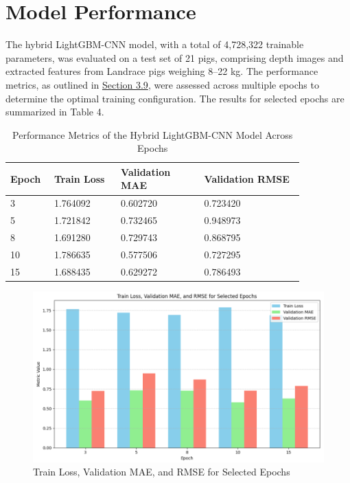 \section{Model Performance}

The hybrid LightGBM-CNN model, with a total of 4,728,322 trainable parameters, was evaluated on a test set of 21 pigs, comprising depth images and extracted features from Landrace pigs weighing 8–22 kg. The performance metrics, as outlined in \hyperref[Section 3.9]{Section 3.9}, were assessed across multiple epochs to determine the optimal training configuration. The results for selected epochs are summarized in Table 4.

\begin{longtable}{| p{0.10\linewidth} | p{0.20\linewidth} | p{0.25\linewidth} | p{0.30\linewidth} |}
	\caption{Performance Metrics of the Hybrid LightGBM-CNN Model Across Epochs}
	\label{tab:Performance Metrics of the Hybrid LightGBM-CNN Model Across Epochs}\\
	\hline
	\textbf{Epoch} & \textbf{Train Loss} & \textbf{Validation MAE} & \textbf{Validation RMSE} \\
	\hline
	3
	& 
	1.764092
	&
	0.602720
	&
	0.723420
	\\
	\hline
	5
	& 
	1.721842 
	&
	0.732465
	&
	0.948973
	\\
	\hline
	8
	& 
	1.691280
	&
	0.729743
	&
	0.868795
	\\
	\hline
	10
	& 
	1.786635 
	&
	0.577506
	&
	0.727295
	\\
	\hline
	15
	& 
	1.688435 
	&
	0.629272
	&
	0.786493
	\\
	\hline
\end{longtable}

\newpage

\begin{figure}[h]
	\centering
	\includegraphics[height=0.4\textheight]{figures/Epoch Graph}
	\caption{Train Loss, Validation MAE, and RMSE for Selected Epochs}
	\label{fig:Epoch}
\end{figure}

